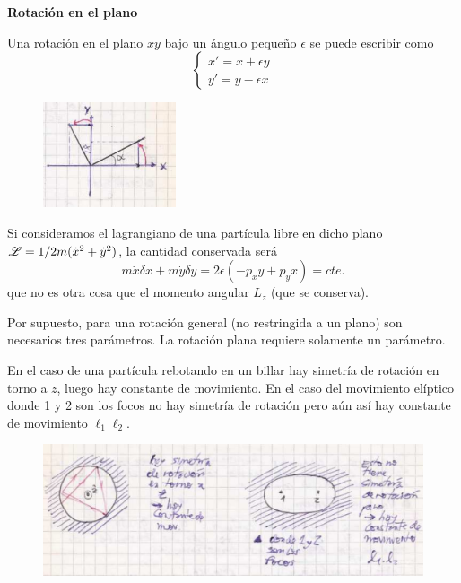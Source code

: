 \documentclass[10pt,oneside]{CBFT_book}
\begin{document}
\begin{ejemplo}{\bfseries Rotación en el plano }

Una rotación en el plano $xy$ bajo un ángulo pequeño $\epsilon$ se puede escribir como 
\[
 \begin{cases}
  x' = x + \epsilon y \\
  y' = y - \epsilon x
 \end{cases}
\]
\begin{figure}[!htb]
	\begin{center}
	\includegraphics[width=0.35\textwidth]{images/fig_mc_noether1.pdf}	 
	\end{center}
	\caption{}
	\label{fig_mc_noether1}
\end{figure} 

Si consideramos el lagrangiano de una partícula libre en dicho plano $ \mathscr{L} = 1/2 m (\dot{x}^2 + \dot{y}^2)$, la 
cantidad conservada será 
\[
	m \dot{x} \delta x + m \dot{y} \delta y = 2\epsilon ( -p_x y + p_y x ) = cte.
\]
que no es otra cosa que el momento angular $L_z$ (que se conserva).

Por supuesto, para una rotación general (no restringida a un plano) son necesarios tres parámetros.
La rotación plana requiere solamente un parámetro.
\end{ejemplo}


En el caso de una partícula rebotando en un billar hay simetría de rotación en torno a $z$, luego hay
constante de movimiento. En el caso del movimiento elíptico donde 1 y 2 son los focos no hay simetría
de rotación pero aún así hay constante de movimiento $ \ell_1 \ell_2 $.

\begin{figure}[!htb]
	\begin{center}
	\includegraphics[width=1.0\textwidth]{images/fig_mc_noether2.pdf}	 
	\end{center}
	\caption{}
	\label{fig_mc_noether2}
\end{figure} 
\end{document}
